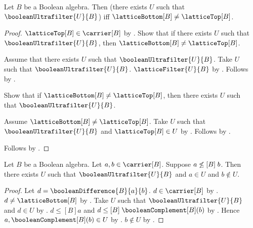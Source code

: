 \begin{theorem}\label{boolean_ultrafilter_exists_iff_bottom_ne_top}
    Let $B$ be a Boolean algebra.
    Then (there exists $U$ such that $\booleanUltrafilter{U}{B}$) iff
        $\latticeBottom[B]\neq\latticeTop[B]$.
\end{theorem}
\begin{proof}
    $\latticeTop[B]\in\carrier[B]$ by .
    Show that if there exists $U$ such that
        $\booleanUltrafilter{U}{B}$, then
        $\latticeBottom[B]\neq\latticeTop[B]$.
    \begin{subproof}
        Assume that there exists $U$ such that
            $\booleanUltrafilter{U}{B}$.
        Take $U$ such that $\booleanUltrafilter{U}{B}$.
        $\latticeFilter{U}{B}$ by
            .
        Follows by .
    \end{subproof}
    Show that if $\latticeBottom[B]\neq\latticeTop[B]$, then
        there exists $U$ such that $\booleanUltrafilter{U}{B}$.
    \begin{subproof}
        Assume $\latticeBottom[B]\neq\latticeTop[B]$.
        Take $U$ such that $\booleanUltrafilter{U}{B}$ and
            $\latticeTop[B]\in U$ by
            .
        Follows by \auto.
    \end{subproof}
    Follows by \auto.
\end{proof}

\begin{theorem}\label{boolean_ultrafilter_separates_order}
    Let $B$ be a Boolean algebra.
    Let $a,b\in\carrier[B]$.
    Suppose $a\not\mathrel{\leq[B]}b$.
    Then there exists $U$ such that
        $\booleanUltrafilter{U}{B}$ and $a\in U$ and $b\notin U$.
\end{theorem}
\begin{proof}
    Let $d=\booleanDifference{B}{a}{b}$.
    $d\in\carrier[B]$ by .
    $d\neq\latticeBottom[B]$ by
        .
    Take $U$ such that $\booleanUltrafilter{U}{B}$ and $d\in U$ by
        .
    $d\mathrel{\leq[B]}a$ and
        $d\mathrel{\leq[B]}\booleanComplement[B](b)$ by
        .
    Hence $a,\booleanComplement[B](b)\in U$ by
        .
    $b\notin U$ by
        .
\end{proof}

